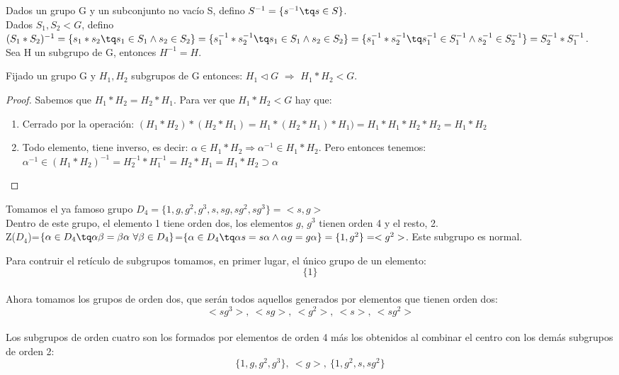 \documentclass[a4paper,10pt]{apuntes}
\newenvironment{example}[1][Ejemplo]{\begin{trivlist}
\item[\hskip \labelsep {\bfseries #1}]}{\end{trivlist}}
\begin{document}
 \newpage
 
 Dados un grupo G y un subconjunto no vacío S, defino $S^{-1}=\{s^{-1}\tq s\in S\}$.\\
 Dados $S_{1},S_{2}<G$, defino $(S_{1}*S_{2})^{-1}=\{s_{1}*s_{2}\tq s_{1}\in S_{1} \wedge s_{2}\in S_{2}\}=\{s_{1}^{-1}*s_{2}^{-1}\tq s_{1}\in S_{1} \wedge s_{2}\in S_{2}\}=
 \{s_{1}^{-1}*s_{2}^{-1}\tq s_{1}^{-1}\in S_{1}^{-1} \wedge s_{2}^{-1}\in S_{2}^{-1}\}=S_{2}^{-1}*S_{1}^{-1}$.\\
 Sea H un subgrupo de G, entonces $H^{-1}=H$.
 
 \begin{theorem}
  Fijado un grupo G y $H_{1}, H_{2}$  subgrupos de G entonces: $H_{1} \vartriangleleft G$ $\Rightarrow$ $H_{1}*H_{2}<G$. 
 \end{theorem}
 \begin{proof}
  Sabemos que $H_{1}*H_{2}=H_{2}*H_{1}$. Para ver que $H_{1}*H_{2}<G$  hay que:
  \begin{enumerate}
   \item Cerrado por la operación: $(H_{1}*H_{2})*(H_{2}*H_{1})=H_{1}*(H_{2}*H_{1})*H_{1})=H_{1}*H_{1}*H_{2}*H_{2}=H_{1}*H_{2}$
   \item Todo elemento, tiene inverso, es decir: $\alpha\in H_{1}*H_{2}\Rightarrow \alpha^{-1}\in H_{1}*H_{2}$. Pero entonces tenemos:
   $\alpha^{-1}\in (H_{1}*H_{2})^{-1} = H_{2}^{-1}*H_{1}^{-1}=H_{2}*H_{1}=H_{1}*H_{2}\supset\alpha$
  \end{enumerate}

 \end{proof}

 \begin{example}
  Tomamos el ya famoso grupo $D_{4}=\{1,g,g^{2},g^{3}, s, sg, sg^{2}, sg^{3}\}=<s,g>$\\
  Dentro de este grupo, el elemento 1 tiene orden dos, los elementos $g$, $g^{3}$  tienen orden 4 y el resto, 2.\\
  Z($D_{4}$)=$\{\alpha\in D_{4} \tq \alpha\beta=\beta\alpha \ \forall \beta \in D_{4}\}$=$\{\alpha\in D_{4}\tq \alpha s = s\alpha \wedge \alpha g = g\alpha\}=\{1, g^{2}\}=<g^{2}>$. Este subgrupo es normal.
  
  Para contruir el retículo de subgrupos tomamos, en primer lugar, el único grupo de un elemento: \\
  $$\{1\}$$\\
  Ahora tomamos los grupos de orden dos, que serán todos aquellos generados por elementos que tienen orden dos:\\
  $$<sg^{3}>, \ <sg>, \ <g^{2}>, \ <s>, \ <sg^{2}>$$\\
  Los subgrupos de orden cuatro son los formados por elementos de orden 4 más los obtenidos al combinar el centro con los demás subgrupos de orden 2:\\
  $$\{1,g,g^{2},g^{3}\}, \ <g>, \ \{1, g^{2}, s, sg^{2}\}$$
 \end{example}
 
\end{document}
